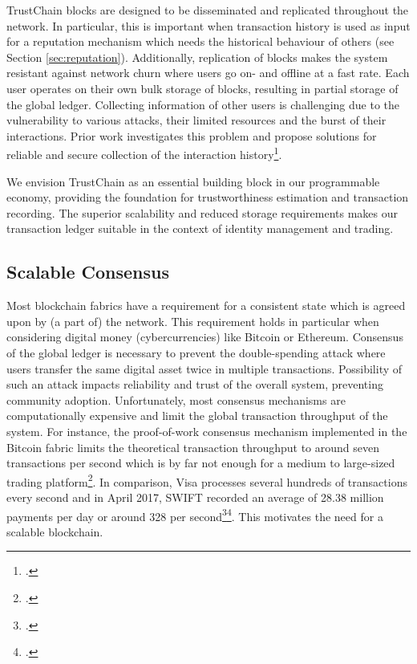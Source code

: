 \documentclass[USenglish]{article}
\begin{document}
TrustChain blocks are designed to be disseminated and replicated throughout the network.
In particular, this is important when transaction history is used as input for a reputation mechanism which needs the historical behaviour of others (see Section \ref{sec:reputation}).
Additionally, replication of blocks makes the system resistant against network churn where users go on- and offline at a fast rate.
Each user operates on their own bulk storage of blocks, resulting in partial storage of the global ledger.
Collecting information of other users is challenging due to the vulnerability to various attacks, their limited resources and the burst of their interactions.
Prior work investigates this problem and propose solutions for reliable and secure collection of the interaction history\footcite{gkoroureducing}.

We envision TrustChain as an essential building block in our programmable economy, providing the foundation for trustworthiness estimation and transaction recording.
The superior scalability and reduced storage requirements makes our transaction ledger suitable in the context of identity management and trading.

\subsection{Scalable Consensus}
\label{sec:scalable_consensus}
Most blockchain fabrics have a requirement for a consistent state which is agreed upon by (a part of) the network.
This requirement holds in particular when considering digital money (cybercurrencies) like Bitcoin or Ethereum.
Consensus of the global ledger is necessary to prevent the double-spending attack where users transfer the same digital asset twice in multiple transactions.
Possibility of such an attack impacts reliability and trust of the overall system, preventing community adoption.
Unfortunately, most consensus mechanisms are computationally expensive and limit the global transaction throughput of the system.
For instance, the proof-of-work consensus mechanism implemented in the Bitcoin fabric limits the theoretical transaction throughput to around seven transactions per second which is by far not enough for a medium to large-sized trading platform\footcite{duebitcoinscale}.
In comparison, Visa processes several hundreds of transactions every second and in April 2017, SWIFT recorded an average of 28.38 million payments per day or around 328 per second\footcite{visatransactions}\footcite{swifttransactions}.
This motivates the need for a scalable blockchain.
\end{document}
